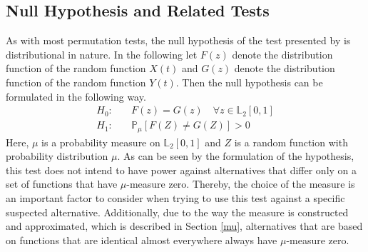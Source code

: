 \documentclass[12pt, a4paper]{article}
\theoremstyle{MAstyle} \newtheorem{assumption}{Assumption}[section]
\theoremstyle{MAstyle} \newtheorem{definition}{Definition}[section]
\theoremstyle{MAstyle} \newtheorem{theorem}{Theorem}[section]
\begin{document}
		\subsection{Null Hypothesis and Related Tests}
			As with most permutation tests, the null hypothesis of the test presented by \cite{bugni_permutation_2021} is distributional in nature. In the following let $F(z)$ denote the distribution function of the random function $X(t)$ and $G(z)$ denote the distribution function of the random function $Y(t)$. Then the null hypothesis can be formulated in the following way.
			\begin{equation}
				\begin{split}
					H_0: \quad &F(z) = G(z) \quad \forall z \in \mathbb{L}_2[0,1] \\
					H_1: \quad &\mathbb{P}_{\mu}\left[F(Z) \neq G(Z)\right] > 0
				\end{split}
			\end{equation}
			Here, $\mu$ is a probability measure on $\mathbb{L}_2[0,1]$ and $Z$ is a random function with probability distribution $\mu$. As can be seen by the formulation of the hypothesis, this test does not intend to have power against alternatives that differ only on a set of functions that have $\mu$-measure zero. Thereby, the choice of the measure is an important factor to consider when trying to use this test against a specific suspected alternative. Additionally, due to the way the measure is constructed and approximated, which is described in Section \ref{mu}, alternatives that are based on functions that are identical almost everywhere always have $\mu$-measure zero. \\
			
\end{document}
